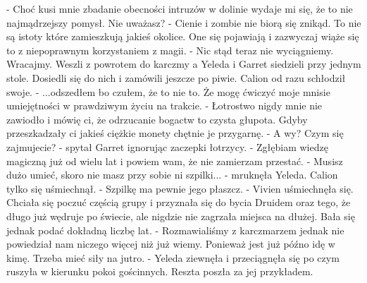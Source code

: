 \documentclass[10pt,twoside,twocolumn]{book}
\begin{document}
\indent - Choć kusi mnie zbadanie obecności intruzów w dolinie wydaje mi się, że to nie najmądrzejszy pomysł. Nie uważasz?\newline
\indent - Cienie i zombie nie biorą się znikąd. To nie są istoty które zamieszkują jakieś okolice. One się pojawiają i zazwyczaj wiąże się to z niepoprawnym korzystaniem z magii.\newline
\indent - Nic stąd teraz nie wyciągniemy. Wracajmy.\newline
Weszli z powrotem do karczmy a Yeleda i Garret siedzieli przy jednym stole. Dosiedli się do nich i zamówili jeszcze po piwie. Calion od razu schłodził swoje.\newline
\indent - ...odszedłem bo czułem, że to nie to. Że mogę ćwiczyć moje mnisie umiejętności w prawdziwym życiu na trakcie.\newline
\indent - Łotrostwo nigdy mnie nie zawiodło i mówię ci, że odrzucanie bogactw to czysta głupota. Gdyby przeszkadzały ci jakieś ciężkie monety chętnie je przygarnę.\newline
\indent - A wy? Czym się zajmujecie? - spytał Garret ignorując zaczepki łotrzycy.\newline
\indent - Zgłębiam wiedzę magiczną już od wielu lat i powiem wam, że nie zamierzam przestać.\newline
\indent - Musisz dużo umieć, skoro nie masz przy sobie ni szpilki... - mruknęła Yeleda. Calion tylko się uśmiechnął.\newline
\indent - Szpilkę ma pewnie jego płaszcz. - Vivien uśmiechnęła się. Chciała się poczuć częścią grupy i przyznała się do bycia Druidem oraz tego, że długo już wędruje po świecie, ale nigdzie nie zagrzała miejsca na dłużej. Bała się jednak podać dokładną liczbę lat.\newline
\indent - Rozmawialiśmy z karczmarzem jednak nie powiedział nam niczego więcej niż już wiemy. Ponieważ jest już późno idę w kimę. Trzeba mieć siły na jutro. - Yeleda ziewnęła i przeciągnęła się po czym ruszyła w kierunku pokoi gościnnych. Reszta poszła za jej przykładem.
\end{document}
